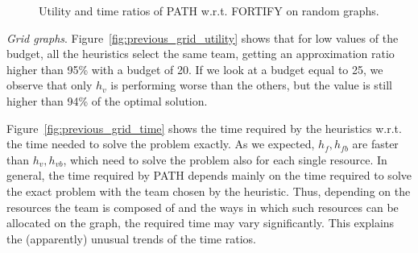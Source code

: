 \begin{figure}[!htbp]
\centering
{}
\caption{Utility and time ratios of PATH w.r.t. FORTIFY on random graphs.}\label{fig:previous_random}
\end{figure}

\textit{Grid graphs}. Figure~\ref{fig:previous_grid_utility} shows that for low values of the budget, all the heuristics select the same team, getting an approximation ratio higher than 95\% with a budget of 20. If we look at a budget equal to 25, we observe that only $h_v$ is performing worse than the others, but the value is still higher than 94\% of the optimal solution.

Figure~\ref{fig:previous_grid_time} shows the time required by the heuristics w.r.t. the time needed to solve the problem exactly. As we expected, $h_f, h_{fb}$ are faster than $h_v, h_{vb}$, which need to solve the problem also for each single resource. In general, the time required by PATH depends mainly on the time required to solve the exact problem with the team chosen by the heuristic. Thus, depending on the resources the team is composed of and the ways in which such resources can be allocated on the graph, the required time may vary significantly. This explains the (apparently) unusual trends of the time ratios.


